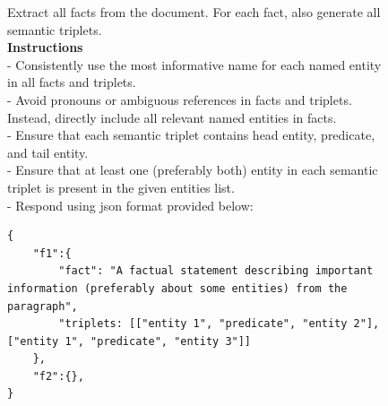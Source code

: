 \documentclass{article} %
\begin{document}
\begin{figure}[!ht]
\tiny
\begin{mdframed}
Extract all facts from the document. For each fact, also generate all semantic triplets. \\
\textbf{Instructions}\\
- Consistently use the most informative name for each named entity in all facts and triplets. \\
- Avoid pronouns or ambiguous references in facts and triplets. Instead, directly include all relevant named entities in facts. \\
- Ensure that each semantic triplet contains head entity, predicate, and tail entity. \\
- Ensure that at least one (preferably both) entity in each semantic triplet is present in the given entities list. \\
- Respond using json format provided below:\\
\begin{verbatim}
{
    "f1":{
        "fact": "A factual statement describing important information (preferably about some entities) from the paragraph",
        "triplets: [["entity 1", "predicate", "entity 2"], ["entity 1", "predicate", "entity 3"]]
    },
    "f2":{},
}   
\end{verbatim}


\end{mdframed}
\end{figure}
\end{document}
